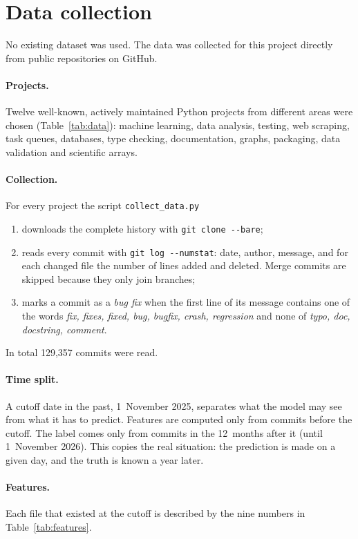 \documentclass[11pt,a4paper]{article}
\begin{document}
\section{Data collection}

No existing dataset was used. The data was collected for this project directly
from public repositories on GitHub.

\paragraph{Projects.} Twelve well-known, actively maintained Python projects
from different areas were chosen (Table~\ref{tab:data}): machine learning,
data analysis, testing, web scraping, task queues, databases, type checking,
documentation, graphs, packaging, data validation and scientific arrays.

\paragraph{Collection.} For every project the script \texttt{collect\_data.py}
\begin{enumerate}
\item downloads the complete history with \texttt{git clone -{}-bare};
\item reads every commit with \texttt{git log -{}-numstat}: date, author,
      message, and for each changed file the number of lines added and
      deleted. Merge commits are skipped because they only join branches;
\item marks a commit as a \emph{bug fix} when the first line of its message
      contains one of the words \emph{fix, fixes, fixed, bug, bugfix, crash,
      regression} and none of \emph{typo, doc, docstring, comment}.
\end{enumerate}
In total 129,357 commits were read.

\paragraph{Time split.} A cutoff date in the past, 1~November 2025, separates
what the model may see from what it has to predict. Features are computed only
from commits before the cutoff. The label comes only from commits in the
12~months after it (until 1~November 2026). This copies the real situation:
the prediction is made on a given day, and the truth is known a year later.

\paragraph{Features.} Each file that existed at the cutoff is described by the
nine numbers in Table~\ref{tab:features}.
\end{document}
